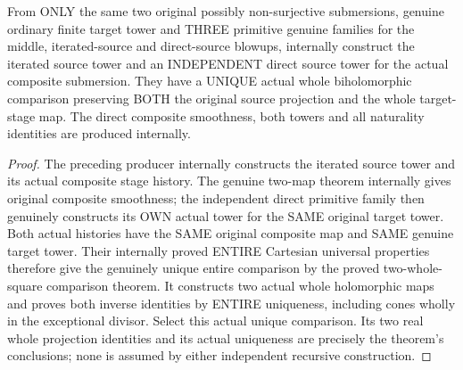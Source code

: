 \begin{theorem}
\label{hir:submersion-tower-composition-actual-comparison}
\leanok
{}
From ONLY the same two original possibly non-surjective submersions, genuine
ordinary finite target tower and THREE primitive genuine families for the
middle, iterated-source and direct-source blowups, internally construct the
iterated source tower and an INDEPENDENT direct source tower for the actual
composite submersion. They have a UNIQUE actual whole biholomorphic comparison
preserving BOTH the original source projection and the whole target-stage map.
The direct composite smoothness, both towers and all naturality identities
are produced internally.
\end{theorem}
\begin{proof}
The preceding producer internally constructs the iterated source tower and
its actual composite stage history. The genuine two-map theorem internally
gives original composite smoothness; the independent direct primitive
family then genuinely constructs its OWN actual tower for the SAME original
target tower. Both actual histories have the SAME original composite map
and SAME genuine target tower. Their internally proved ENTIRE Cartesian
universal properties therefore give the genuinely unique entire comparison
by the proved two-whole-square comparison theorem. It constructs two actual
whole holomorphic maps and proves both inverse identities by ENTIRE
uniqueness, including cones wholly in the exceptional divisor. Select this
actual unique comparison. Its two real whole projection identities and
its actual uniqueness are precisely the theorem's conclusions; none is
assumed by either independent recursive construction.
\end{proof}

